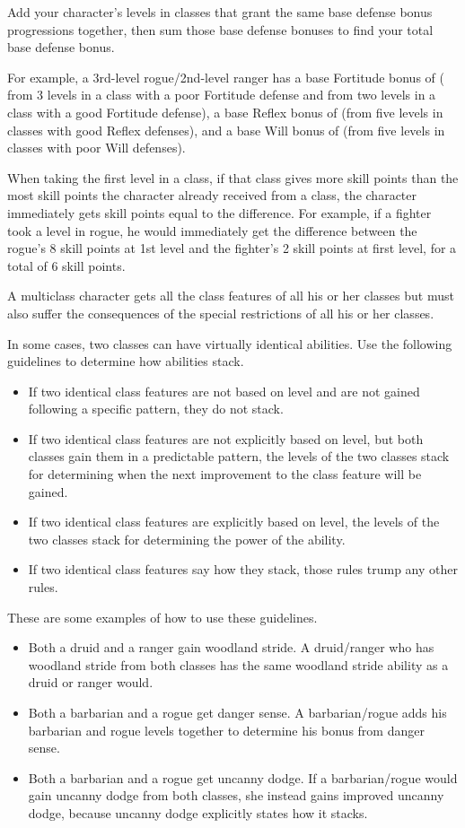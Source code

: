  Add your character's levels in classes that grant the same base defense bonus progressions together, then sum those base defense bonuses to find your total base defense bonus.

\par For example, a 3rd-level rogue/2nd-level ranger has a base Fortitude bonus of  ( from 3 levels in a class with a poor Fortitude defense and  from two levels in a class with a good Fortitude defense), a base Reflex bonus of  (from five levels in classes with good Reflex defenses), and a base Will bonus of  (from five levels in classes with poor Will defenses).

 When taking the first level in a class, if that class gives more skill points than the most skill points the character already received from a class, the character immediately gets skill points equal to the difference. For example, if a fighter took a level in rogue, he would immediately get the difference between the rogue's 8 skill points at 1st level and the fighter's 2 skill points at first level, for a total of 6 skill points.

 A multiclass character gets all the class features
of all his or her classes but must also suffer the consequences of the
special restrictions of all his or her classes.

\par In some cases, two classes can have virtually identical abilities.
Use the following guidelines to determine how abilities stack.
\begin{itemize}
\item If two identical class features are not based on level and are not gained following a specific pattern, they do not stack.
\item If two identical class features are not explicitly based on level, but both classes gain them in a predictable pattern, the levels of the two classes stack for determining when the next improvement to the class feature will be gained.
\item If two identical class features are explicitly based on level, the levels of the two classes stack for determining the power of the ability.
\item If two identical class features say how they stack, those rules trump any other rules.
\end{itemize}
These are some examples of how to use these guidelines.
\begin{itemize}
\item Both a druid and a ranger gain woodland stride. A druid/ranger who has woodland stride from both classes has the same woodland stride ability as a druid or ranger would.
\item Both a barbarian and a rogue get danger sense. A barbarian/rogue adds his barbarian and rogue levels together to determine his bonus from danger sense.
\item Both a barbarian and a rogue get uncanny dodge. If a barbarian/rogue would gain uncanny dodge from both classes, she instead gains improved uncanny dodge, because uncanny dodge explicitly states how it stacks.
\end{itemize}

